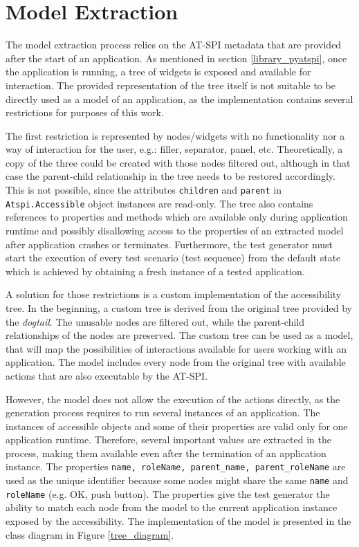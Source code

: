 \section{Model Extraction}
The model extraction process relies on the AT-SPI metadata that are provided after the start of an application. As mentioned in section \ref{library_pyatspi}, once the application is running, a tree of widgets is exposed and available for interaction. The provided representation of the tree itself is not suitable to be directly used as a model of an application, as the implementation contains several restrictions for purposes of this work.

The first restriction is represented by nodes/widgets with no functionality nor a way of interaction for the user, e.g.: filler, separator, panel, etc. Theoretically, a copy of the three could be created with those nodes filtered out, although in that case the parent-child relationship in the tree needs to be restored accordingly. This is not possible, since the attributes \texttt{children} and \texttt{parent} in \texttt{Atspi.Accessible} object instances are read-only. The tree also contains references to properties and methods which are available only during application runtime and possibly disallowing access to the properties of an extracted model after application crashes or terminates. Furthermore, the test generator must start the execution of every test scenario (test sequence) from the default state which is achieved by obtaining a fresh instance of a tested application.

A solution for those restrictions is a custom implementation of the accessibility tree. In the beginning, a custom tree is derived from the original tree provided by the \textit{dogtail}. The unusable nodes are filtered out, while the parent-child relationships of the nodes are preserved. The custom tree can be used as a model, that will map the possibilities of interactions available for users working with an application. The model includes every node from the original tree with available actions that are also executable by the AT-SPI. 

However, the model does not allow the execution of the actions directly, as the generation process requires to run several instances of an application. The instances of accessible objects and some of their properties are valid only for one application runtime. Therefore, several important values are extracted in the process, making them available even after the termination of an application instance. The properties \texttt{name, roleName, parent\_name, parent\_roleName} are used as the unique identifier because some nodes might share the same \texttt{name} and \texttt{roleName} (e.g. OK, push button). The properties give the test generator the ability to match each node from the model to the current application instance exposed by the accessibility. The implementation of the model is presented in the class diagram in Figure \ref{tree_diagram}.

